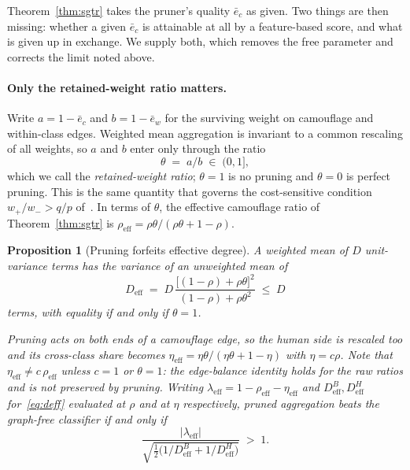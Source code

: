 \documentclass[onecolumn,pdflatex,sn-basic,Numbered]{sn-jnl}
\theoremstyle{thmstyleone}
\newtheorem{proposition}[theorem]{Proposition}
\theoremstyle{thmstylethree}
\begin{document}
Theorem~\ref{thm:sgtr} takes the pruner's quality $\bar e_c$ as given. Two things
are then missing: whether a given $\bar e_c$ is attainable at all by a
feature-based score, and what is given up in exchange. We supply both, which
removes the free parameter and corrects the limit noted above.

\paragraph{Only the retained-weight ratio matters.}
Write $a = 1-\bar e_c$ and $b = 1-\bar e_w$ for the surviving weight on camouflage
and within-class edges. Weighted mean aggregation is invariant to a common rescaling
of all weights, so $a$ and $b$ enter only through the ratio
\begin{equation}
    \theta \;=\; a/b \;\in\; (0,1] ,
    \label{eq:theta}
\end{equation}
which we call the \emph{retained-weight ratio}; $\theta = 1$ is no pruning and
$\theta = 0$ is perfect pruning. This is the same quantity that governs the
cost-sensitive condition $w_+/w_- > q/p$ of~\citep{weiss2026cost}. In terms of
$\theta$, the effective camouflage ratio of Theorem~\ref{thm:sgtr} is
$\rho_{\mathrm{eff}} = \rho\theta/(\rho\theta + 1-\rho)$.

\begin{proposition}[Pruning forfeits effective degree]
\label{prop:deff}
A weighted mean of $D$ unit-variance terms has the variance of an unweighted mean
of
\begin{equation}
    D_{\mathrm{eff}}
    \;=\; D\,\frac{\bigl[(1-\rho) + \rho\theta\bigr]^2}
                   {(1-\rho) + \rho\theta^{2}}
    \;\leq\; D
    \label{eq:deff}
\end{equation}
terms, with equality if and only if $\theta = 1$.

Pruning acts on \emph{both} ends of a camouflage edge, so the human side is
rescaled too and its cross-class share becomes
$\eta_{\mathrm{eff}} = \eta\theta/(\eta\theta + 1-\eta)$ with $\eta = c\rho$. Note
that $\eta_{\mathrm{eff}} \neq c\,\rho_{\mathrm{eff}}$ unless $c=1$ or $\theta=1$:
the edge-balance identity holds for the \emph{raw} ratios and is not preserved by
pruning. Writing
$\lambda_{\mathrm{eff}} = 1 - \rho_{\mathrm{eff}} - \eta_{\mathrm{eff}}$ and
$D^{B}_{\mathrm{eff}}, D^{H}_{\mathrm{eff}}$ for~\eqref{eq:deff} evaluated at $\rho$
and at $\eta$ respectively, pruned aggregation beats the graph-free classifier if and
only if
\begin{equation}
    \frac{|\lambda_{\mathrm{eff}}|}
         {\sqrt{\tfrac12\bigl(1/D^{B}_{\mathrm{eff}} + 1/D^{H}_{\mathrm{eff}}\bigr)}}
    \;>\; 1 .
    \label{eq:pruned-condition}
\end{equation}
\end{proposition}
\end{document}

